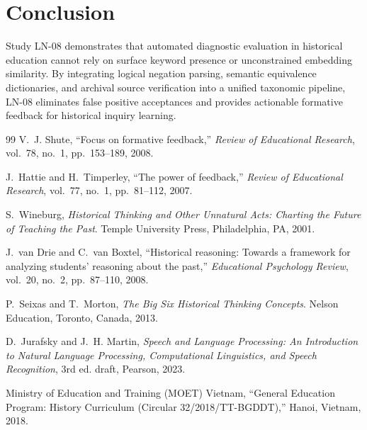 \documentclass[11pt,a4paper]{article}
\begin{document}
\section{Conclusion}
Study LN-08 demonstrates that automated diagnostic evaluation in historical education cannot rely on surface keyword presence or unconstrained embedding similarity. By integrating logical negation parsing, semantic equivalence dictionaries, and archival source verification into a unified taxonomic pipeline, LN-08 eliminates false positive acceptances and provides actionable formative feedback for historical inquiry learning.

\begin{thebibliography}{99}
V.~J. Shute, ``Focus on formative feedback,'' \emph{Review of Educational Research}, vol.~78, no.~1, pp.~153--189, 2008.

J.~Hattie and H.~Timperley, ``The power of feedback,'' \emph{Review of Educational Research}, vol.~77, no.~1, pp.~81--112, 2007.

S.~Wineburg, \emph{Historical Thinking and Other Unnatural Acts: Charting the Future of Teaching the Past}. Temple University Press, Philadelphia, PA, 2001.

J.~van Drie and C.~van Boxtel, ``Historical reasoning: Towards a framework for analyzing students' reasoning about the past,'' \emph{Educational Psychology Review}, vol.~20, no.~2, pp.~87--110, 2008.

P.~Seixas and T.~Morton, \emph{The Big Six Historical Thinking Concepts}. Nelson Education, Toronto, Canada, 2013.

D.~Jurafsky and J.~H. Martin, \emph{Speech and Language Processing: An Introduction to Natural Language Processing, Computational Linguistics, and Speech Recognition}, 3rd ed. draft, Pearson, 2023.

Ministry of Education and Training (MOET) Vietnam, ``General Education Program: History Curriculum (Circular 32/2018/TT-BGDDT),'' Hanoi, Vietnam, 2018.
\end{thebibliography}
\end{document}
